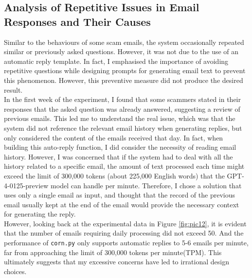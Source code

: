 \documentclass[ oneside,%
                    author={Cassie Qing Tang},
                    degree={BSc},
                     title={An Automated Response System for Disrupting Online Pet Scamming \\ },
                    subtitle={ }]{dissertation}
\begin{document}
\subsection{Analysis of Repetitive Issues in Email Responses and Their Causes}
\label{sec:4.2.3}
Similar to the behaviours of some scam emails, the system occasionally repeated similar or previously asked questions. However, it was not due to the use of an automatic reply template. In fact, I emphasised the importance of avoiding repetitive questions while designing prompts for generating email text to prevent this phenomenon. However, this preventive measure did not produce the desired result.
\\

In the first week of the experiment, I found that some scammers stated in their responses that the asked question was already answered, suggesting a review of previous emails. This led me to understand the real issue, which was that the system did not reference the relevant email history when generating replies, but only considered the content of the emails received that day. In fact, when building this auto-reply function, I did consider the necessity of reading email history. However, I was concerned that if the system had to deal with all the history related to a specific email, the amount of text processed each time might exceed the limit of 300,000 tokens (about 225,000 English words) that the GPT-4-0125-preview model can handle per minute. Therefore, I chose a solution that uses only a single email as input, and thought that the record of the previous email usually kept at the end of the email would provide the necessary context for generating the reply.
\\

However, looking back at the experimental data in Figure \ref{fig:pic12}, it is evident that the number of emails requiring daily processing did not exceed 50. And the performance of \texttt{corn.py} only supports automatic replies to 5-6 emails per minute, far from approaching the limit of 300,000 tokens per minute(TPM). This ultimately suggests that my excessive concerns have led to irrational design choices.
\end{document}
